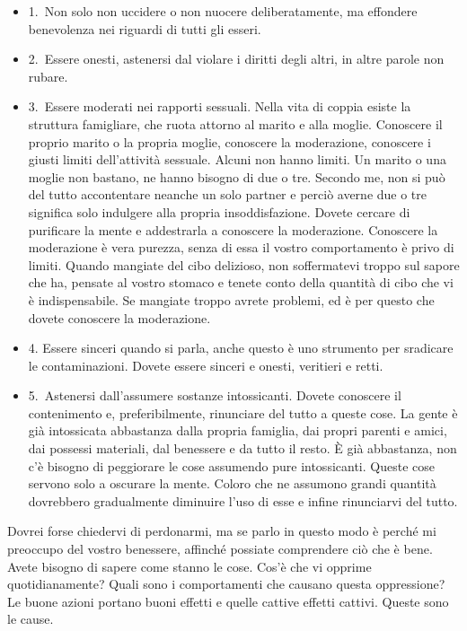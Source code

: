 \begin{itemize}
\item
  1.~Non solo non uccidere o non nuocere deliberatamente, ma effondere
  benevolenza nei riguardi di tutti gli esseri.
\item
  2.~Essere onesti, astenersi dal violare i diritti degli altri, in
  altre parole non rubare.
\item
  3.~Essere moderati nei rapporti sessuali. Nella vita di coppia esiste
  la struttura famigliare, che ruota attorno al marito e alla moglie.
  Conoscere il proprio marito o la propria moglie, conoscere la
  moderazione, conoscere i giusti limiti dell'attività sessuale. Alcuni
  non hanno limiti. Un marito o una moglie non bastano, ne hanno bisogno
  di due o tre. Secondo me, non si può del tutto accontentare neanche un
  solo partner e perciò averne due o tre significa solo indulgere alla
  propria insoddisfazione. Dovete cercare di purificare la mente e
  addestrarla a conoscere la moderazione. Conoscere la moderazione è
  vera purezza, senza di essa il vostro comportamento è privo di limiti.
  Quando mangiate del cibo delizioso, non soffermatevi troppo sul sapore
  che ha, pensate al vostro stomaco e tenete conto della quantità di
  cibo che vi è indispensabile. Se mangiate troppo avrete problemi, ed è
  per questo che dovete conoscere la moderazione.
\item
  4. Essere sinceri quando si parla, anche questo è uno strumento per
  sradicare le contaminazioni. Dovete essere sinceri e onesti, veritieri
  e retti.
\item
  5.~Astenersi dall'assumere sostanze intossicanti. Dovete conoscere il
  contenimento e, preferibilmente, rinunciare del tutto a queste cose.
  La gente è già intossicata abbastanza dalla propria famiglia, dai
  propri parenti e amici, dai possessi materiali, dal benessere e da
  tutto il resto. È già abbastanza, non c'è bisogno di peggiorare le
  cose assumendo pure intossicanti. Queste cose servono solo a oscurare
  la mente. Coloro che ne assumono grandi quantità dovrebbero
  gradualmente diminuire l'uso di esse e infine rinunciarvi del tutto.
\end{itemize}

Dovrei forse chiedervi di perdonarmi, ma se parlo in questo modo è
perché mi preoccupo del vostro benessere, affinché possiate comprendere
ciò che è bene. Avete bisogno di sapere come stanno le cose. Cos'è che
vi opprime quotidianamente? Quali sono i comportamenti che causano
questa oppressione? Le buone azioni portano buoni effetti e quelle
cattive effetti cattivi. Queste sono le cause.

